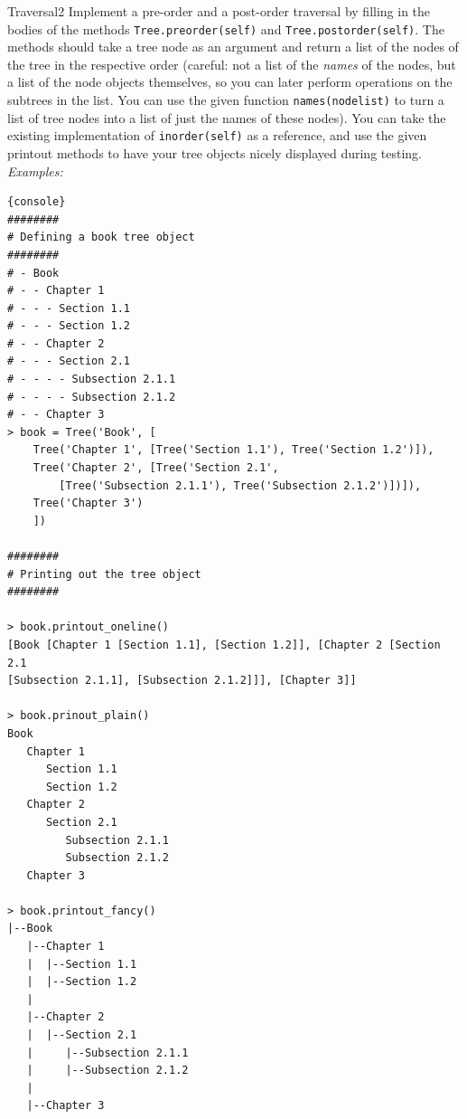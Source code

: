 

\usepackage[linguistics]{forest} %



\def \sheetnr {09}
\def \sheettitle {Trees and X-bar theory}
\def \handedout {Monday 22\textsuperscript{nd} July, 14:00}
\def \tosubmit {Monday 29\textsuperscript{th} July, 14:00}
\def \totalpoints {8}
\setuptitle

\begin{task}{Traversal}{2}
Implement a pre-order and a post-order traversal by filling in the bodies of the methods \texttt{Tree.preorder(self)} and \texttt{Tree.postorder(self)}. The methods should take a tree node as an argument and return a list of the nodes of the tree in the respective order (careful: not a list of the \emph{names} of the nodes, but a list of the node objects themselves, so you can later perform operations on the subtrees in the list. You can use the given function \texttt{names(nodelist)} to turn a list of tree nodes into a list of just the names of these nodes). You can take the existing implementation of \texttt{inorder(self)} as a reference, and use the given printout methods to have your tree objects nicely displayed during testing.\\

\textit{Examples:}\begin{lstlisting}{console}
########
# Defining a book tree object
########
# - Book
# - - Chapter 1
# - - - Section 1.1
# - - - Section 1.2
# - - Chapter 2
# - - - Section 2.1
# - - - - Subsection 2.1.1
# - - - - Subsection 2.1.2
# - - Chapter 3
> book = Tree('Book', [
    Tree('Chapter 1', [Tree('Section 1.1'), Tree('Section 1.2')]),
    Tree('Chapter 2', [Tree('Section 2.1',
        [Tree('Subsection 2.1.1'), Tree('Subsection 2.1.2')])]),
    Tree('Chapter 3')
    ])

########
# Printing out the tree object
########

> book.printout_oneline()
[Book [Chapter 1 [Section 1.1], [Section 1.2]], [Chapter 2 [Section 2.1 
[Subsection 2.1.1], [Subsection 2.1.2]]], [Chapter 3]]

> book.prinout_plain()
Book
   Chapter 1
      Section 1.1
      Section 1.2
   Chapter 2
      Section 2.1
         Subsection 2.1.1
         Subsection 2.1.2
   Chapter 3

> book.printout_fancy()
|--Book
   |--Chapter 1
   |  |--Section 1.1
   |  |--Section 1.2
   |  
   |--Chapter 2
   |  |--Section 2.1
   |     |--Subsection 2.1.1
   |     |--Subsection 2.1.2
   |  
   |--Chapter 3



\end{lstlisting}
\end{task}
